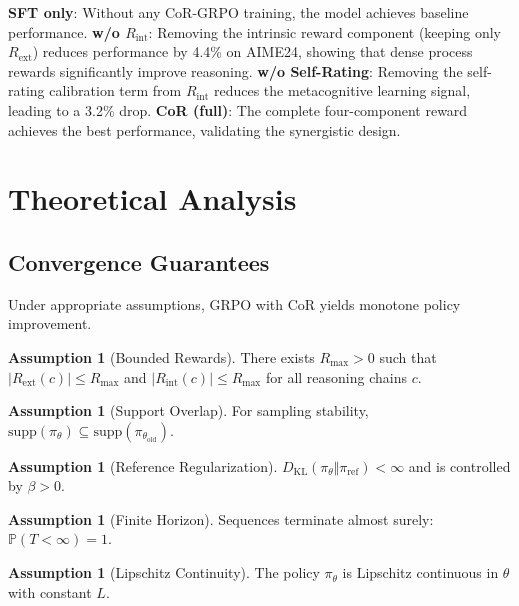 \documentclass{article}
\theoremstyle{plain}
\theoremstyle{definition}
\newtheorem{assumption}[theorem]{Assumption}
\theoremstyle{remark}
\begin{document}
\textbf{SFT only}: Without any CoR-GRPO training, the model achieves baseline performance. \textbf{w/o $R_{\text{int}}$}: Removing the intrinsic reward component (keeping only $R_{\text{ext}}$) reduces performance by 4.4\% on AIME24, showing that dense process rewards significantly improve reasoning. \textbf{w/o Self-Rating}: Removing the self-rating calibration term from $R_{\text{int}}$ reduces the metacognitive learning signal, leading to a 3.2\% drop. \textbf{CoR (full)}: The complete four-component reward achieves the best performance, validating the synergistic design.

\FloatBarrier

\section{Theoretical Analysis}
\label{sec:theory}

\subsection{Convergence Guarantees}

Under appropriate assumptions, GRPO with CoR yields monotone policy improvement.

\begin{assumption}[Bounded Rewards]
\label{assum:bounded}
There exists $R_{\max} > 0$ such that $|R_{\text{ext}}(c)| \leq R_{\max}$ and $|R_{\text{int}}(c)| \leq R_{\max}$ for all reasoning chains $c$.
\end{assumption}

\begin{assumption}[Support Overlap]
\label{assum:support}
For sampling stability, $\text{supp}(\pi_\theta) \subseteq \text{supp}(\pi_{\theta_{\text{old}}})$.
\end{assumption}

\begin{assumption}[Reference Regularization]
\label{assum:reference}
$D_{\text{KL}}(\pi_\theta \Vert \pi_{\text{ref}}) < \infty$ and is controlled by $\beta > 0$.
\end{assumption}

\begin{assumption}[Finite Horizon]
\label{assum:horizon}
Sequences terminate almost surely: $\mathbb{P}(T < \infty) = 1$.
\end{assumption}

\begin{assumption}[Lipschitz Continuity]
\label{assum:lipschitz}
The policy $\pi_\theta$ is Lipschitz continuous in $\theta$ with constant $L$.
\end{assumption}
\end{document}
